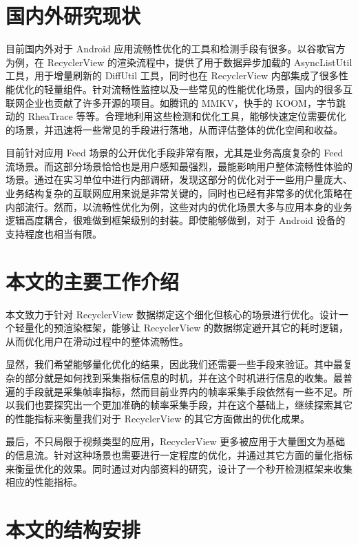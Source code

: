 \section{国内外研究现状}

目前国内外对于 Android 应用流畅性优化的工具和检测手段有很多。以谷歌官方为例，在 RecyclerView 的渲染流程中，提供了用于数据异步加载的 AsyncListUtil 工具，用于增量刷新的 DiffUtil 工具，同时也在 RecyclerView 内部集成了很多性能优化的轻量组件。针对流畅性监控以及一些常见的性能优化场景，国内的很多互联网企业也贡献了许多开源的项目。如腾讯的 MMKV，快手的 KOOM，字节跳动的 RheaTrace 等等。合理地利用这些检测和优化工具，能够快速定位需要优化的场景，并迅速将一些常见的手段进行落地，从而评估整体的优化空间和收益。

目前针对应用 Feed 场景的公开优化手段非常有限，尤其是业务高度复杂的 Feed 流场景。而这部分场景恰恰也是用户感知最强烈，最能影响用户整体流畅性体验的场景。通过在实习单位中进行内部调研，发现这部分的优化对于一些用户量庞大、业务结构复杂的互联网应用来说是非常关键的，同时也已经有非常多的优化策略在内部流行。然而，以流畅性优化为例，这些对内的优化场景大多与应用本身的业务逻辑高度耦合，很难做到框架级别的封装。即使能够做到，对于 Android 设备的支持程度也相当有限。

\section{本文的主要工作介绍}

本文致力于针对 RecyclerView 数据绑定这个细化但核心的场景进行优化。设计一个轻量化的预渲染框架，能够让 RecyclerView 的数据绑定避开其它的耗时逻辑，从而优化用户在滑动过程中的整体流畅性。

显然，我们希望能够量化优化的结果，因此我们还需要一些手段来验证。其中最复杂的部分就是如何找到采集指标信息的时机，并在这个时机进行信息的收集。最普遍的手段就是采集帧率指标，然而目前业界内的帧率采集手段依然有一些不足。所以我们也要探究出一个更加准确的帧率采集手段，并在这个基础上，继续探索其它的性能指标来衡量我们对于 RecyclerView 的其它方面做出的优化成果。

最后，不只局限于视频类型的应用，RecyclerView 更多被应用于大量图文为基础的信息流。针对这种场景也需要进行一定程度的优化，并通过其它方面的量化指标来衡量优化的效果。同时通过对内部资料的研究，设计了一个秒开检测框架来收集相应的性能指标。

\section{本文的结构安排}

